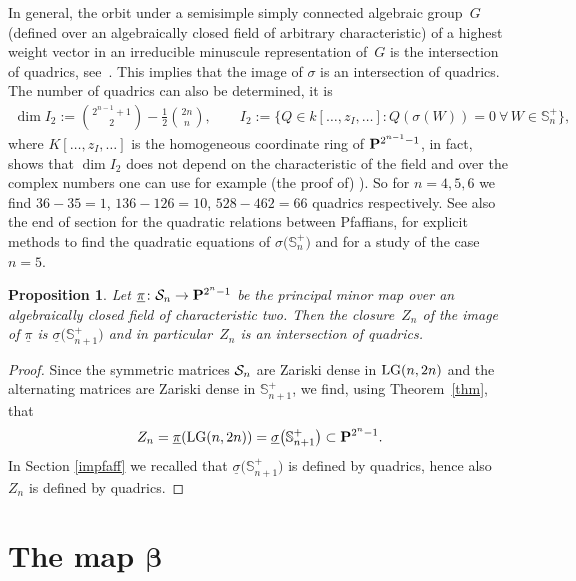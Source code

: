 \documentclass[pdftex]{sigma}
\newcommand{\PP}{{\bf P}}
\newcommand{\bS}{{\mathbb S}}
\newcommand{\cS}{{\cal S}}
\numberwithin{equation}{section}
\newtheorem{Proposition}[Theorem]{Proposition}
{ \theoremstyle{definition}
\newtheorem{Definition}[Theorem]{Definition}
\newtheorem{Example}[Theorem]{Example}
\newtheorem{Examples}[Theorem]{Examples}
\newtheorem{Remark}[Theorem]{Remark} }
\begin{document}
In general, the orbit under a semisimple simply connected algebraic group~$G$ (defined over an algebraically closed field of arbitrary characteristic) of a highest weight vector in an irreducible minuscule representation of~$G$ is the intersection of quadrics, see~\cite{S}. This implies that the image of $\sigma$ is an intersection of quadrics. The number of quadrics can also be determined, it is
\begin{gather*}
\dim I_2 := \binom{2^{n-1}+1}{2} - \frac{1}{2}\binom{2n}{n},\qquad
I_2 := \big\{Q\in k[\ldots,z_I,\ldots]\colon Q(\sigma(W)) = 0\ \forall\, W\in \bS_n^+ \big\},
\end{gather*}
where $K[\ldots,z_I,\ldots]$ is the homogeneous coordinate ring of $\PP^{2^{n-1}-1}$, in fact, \cite{S} shows that $\dim I_2$ does not depend on the characteristic of the field
and over the complex numbers one can use for example (the proof of) \cite[Theorem~2]{vGspin}). So for $n=4,5,6$ we find $36-35=1$, \mbox{$136-126=10$}, $528-462=66$ quadrics respectively. See also the end of section \cite[Section~11.7.2]{P} for the quadratic relations between Pfaffians, \cite{SV} for explicit methods to find the quadratic equations of $\sigma\big(\bS_{n}^+\big)$ and \cite[Section~6]{RS} for a study of the case $n=5$.

\begin{Proposition}\label{quadr} Let $\underline{\pi}\colon \cS_n \rightarrow \PP^{2^n -1}$ be the principal minor map over an algebraically closed field of characteristic two. Then the closure~$Z_n$ of the image of $\underline{\pi}$ is $\underline{\sigma}\big(\bS_{n+1}^+\big)$ and in particular~$Z_n$ is an intersection of quadrics.
\end{Proposition}

\begin{proof} Since the symmetric matrices $\cS_n$ are Zariski dense in ${\rm LG}(n,2n)$ and the alternating matrices are Zariski dense in $\bS_{n+1}^+$, we find, using Theorem~\ref{thm}, that
\begin{gather*}
Z_n = \underline{\pi}({\rm LG}(n,2n)) = \underline{\sigma}\big(\bS_{n+1}^+\big) \subset\PP^{2^n-1}.
\end{gather*}
In Section \ref{impfaff} we recalled that $\underline{\sigma}\big(\bS_{n+1}^+\big)$ is defined by quadrics, hence also $Z_n$ is defined by quadrics.
\end{proof}

\section[The map $\beta$]{The map $\boldsymbol{\beta}$}\label{beta}
\end{document}
